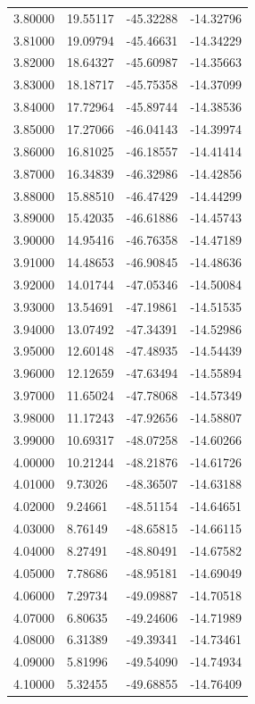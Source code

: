 \begin{table}
\begin{tabular}{llll}
3.80000 & 19.55117 & -45.32288 & -14.32796 \\
3.81000 & 19.09794 & -45.46631 & -14.34229 \\
3.82000 & 18.64327 & -45.60987 & -14.35663 \\
3.83000 & 18.18717 & -45.75358 & -14.37099 \\
3.84000 & 17.72964 & -45.89744 & -14.38536 \\
3.85000 & 17.27066 & -46.04143 & -14.39974 \\
3.86000 & 16.81025 & -46.18557 & -14.41414 \\
3.87000 & 16.34839 & -46.32986 & -14.42856 \\
3.88000 & 15.88510 & -46.47429 & -14.44299 \\
3.89000 & 15.42035 & -46.61886 & -14.45743 \\
3.90000 & 14.95416 & -46.76358 & -14.47189 \\
3.91000 & 14.48653 & -46.90845 & -14.48636 \\
3.92000 & 14.01744 & -47.05346 & -14.50084 \\
3.93000 & 13.54691 & -47.19861 & -14.51535 \\
3.94000 & 13.07492 & -47.34391 & -14.52986 \\
3.95000 & 12.60148 & -47.48935 & -14.54439 \\
3.96000 & 12.12659 & -47.63494 & -14.55894 \\
3.97000 & 11.65024 & -47.78068 & -14.57349 \\
3.98000 & 11.17243 & -47.92656 & -14.58807 \\
3.99000 & 10.69317 & -48.07258 & -14.60266 \\
4.00000 & 10.21244 & -48.21876 & -14.61726 \\
4.01000 & 9.73026 & -48.36507 & -14.63188 \\
4.02000 & 9.24661 & -48.51154 & -14.64651 \\
4.03000 & 8.76149 & -48.65815 & -14.66115 \\
4.04000 & 8.27491 & -48.80491 & -14.67582 \\
4.05000 & 7.78686 & -48.95181 & -14.69049 \\
4.06000 & 7.29734 & -49.09887 & -14.70518 \\
4.07000 & 6.80635 & -49.24606 & -14.71989 \\
4.08000 & 6.31389 & -49.39341 & -14.73461 \\
4.09000 & 5.81996 & -49.54090 & -14.74934 \\
4.10000 & 5.32455 & -49.68855 & -14.76409 \\

\end{tabular}
\end{table}
